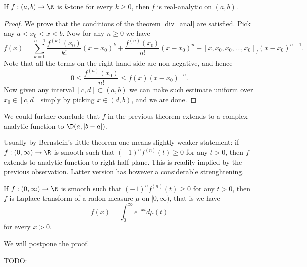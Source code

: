 \begin{lause}
	If $f : (a, b) \to \R$ is $k$-tone for every $k \geq 0$, then $f$ is real-analytic on $(a, b)$.
\end{lause}
\begin{proof}
	We prove that the conditions of the theorem \ref{div_anal} are satisfied. Pick any $a < x_{0} < x < b$. Now for any $n \geq 0$ we have
	\[
		f(x) = \sum_{k = 0}^{n - 1} \frac{f^{(k)}(x_{0})}{k!}(x - x_{0})^{k} + \frac{f^{(n)}(x_{0})}{n!} (x - x_{0})^{n} + [x, x_{0}, x_{0}, \ldots, x_{0}]_{f} (x - x_{0})^{n + 1}.
	\]
	Note that all the terms on the right-hand side are non-negative, and hence
	\[
		0 \leq \frac{f^{(n)}(x_{0})}{n!} \leq f(x) (x - x_{0})^{-n}.
	\]
	Now given any interval $[c, d] \subset (a, b)$ we can make such estimate uniform over $x_{0} \in [c, d]$ simply by picking $x \in (d, b)$, and we are done.
\end{proof}

We could further conclude that $f$ in the previous theorem extends to a complex analytic function to $\D(a, |b - a|)$.

Usually by Bernstein's little theorem one means slightly weaker statement: if $f : (0, \infty) \to \R$ is smooth such that $(-1)^{n} f^{(n)}(t) \geq 0$ for any $t > 0$, then $f$ extends to analytic function to right half-plane. This is readily implied by the previous observation. Latter version has however a considerable strenghtening.

\begin{lause}
	If $f : (0, \infty) \to \R$ is smooth such that $(-1)^{n} f^{(n)}(t) \geq 0$ for any $t > 0$, then $f$ is Laplace transform of a radon measure $\mu$ on $[0, \infty)$, that is we have
	\[
		f(x) = \int_{0}^{\infty} e^{-x t} d \mu(t)
	\]
	for every $x > 0$.
\end{lause}

We will postpone the proof.

TODO:

